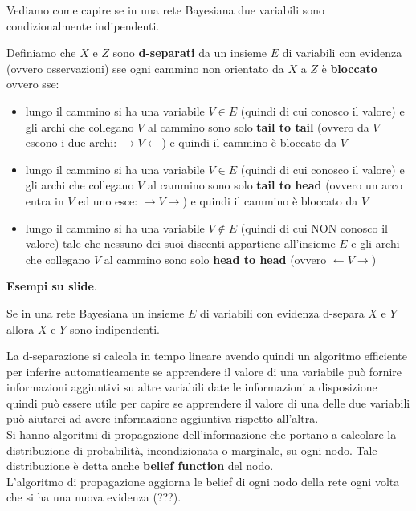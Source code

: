 \documentclass[a4paper,12pt, oneside]{book}
\begin{document}
Vediamo come capire se in una rete Bayesiana due variabili sono condizionalmente
indipendenti.
\begin{definizione}
  Definiamo che $X$ e $Z$ sono \textbf{d-separati} da un insieme $E$ di
  variabili con evidenza (ovvero osservazioni) sse ogni cammino non orientato da
  $X$ a $Z$ è \textbf{bloccato} ovvero sse:
  \begin{itemize}
    \item lungo il cammino si ha una variabile $V\in E$ (quindi di cui conosco
    il valore) e gli archi che
    collegano $V$ al cammino sono solo \textbf{tail to tail} (ovvero da $V$
    escono i 
    due archi: $\to V\gets$) e quindi il cammino è bloccato da $V$
    \item lungo il cammino si ha una variabile $V\in E$ (quindi di cui conosco
    il valore) e gli archi che
    collegano $V$ al cammino sono solo \textbf{tail to head} (ovvero un arco
    entra in 
    $V$ ed uno esce: $\to V\to$) e quindi il cammino è bloccato da $V$
    \item lungo il cammino si ha una variabile $V\not\in E$ (quindi di cui NON
    conosco il valore) tale che nessuno dei
    suoi discenti appartiene all'insieme $E$ e gli archi che
    collegano $V$ al cammino sono solo \textbf{head to head} (ovvero $\gets V
    \to$) 
  \end{itemize}
\end{definizione}
\textbf{Esempi su slide}.\\
\begin{teorema}
  Se in una rete Bayesiana un insieme $E$ di variabili con evidenza d-separa $X$
  e $Y$ allora $X$ e $Y$ sono indipendenti.
\end{teorema}
La d-separazione si calcola in tempo lineare avendo quindi un algoritmo
efficiente per inferire automaticamente se apprendere il valore di una variabile
può fornire informazioni aggiuntivi su altre variabili date le informazioni a
disposizione quindi può essere utile per capire se apprendere il valore di una
delle due variabili può aiutarci ad avere informazione aggiuntiva rispetto
all’altra.\\ 
Si hanno algoritmi di propagazione dell'informazione che portano a calcolare la
distribuzione di probabilità, incondizionata o marginale, su ogni nodo. Tale
distribuzione è detta anche \textbf{belief function} del nodo. \\
L'algoritmo di propagazione aggiorna le belief di ogni nodo della rete ogni
volta che si ha una nuova evidenza (???).\\
\end{document}
